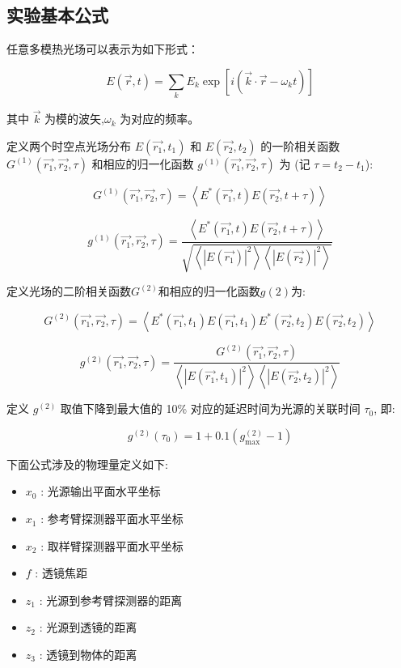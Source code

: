\documentclass[12pt,a4paper]{article}
\newcommand{\be}[1]{
    \begin{equation}
        #1
    \end{equation}
}
\begin{document}
\subsection{实验基本公式}
任意多模热光场可以表示为如下形式：
\be{E(\vec{r}, t)=\sum_{k} E_{k} \exp \left[i\left(\vec{k} \cdot \vec{r}-\omega_{k} t\right)\right]}
其中 $\vec k$ 为模的波矢,$\omega_k$ 为对应的频率。

定义两个时空点光场分布 $E(\vec{r_1}, t_1)$ 和 $E(\vec{r_2}, t_2)$ 的一阶相关函数 $G^{(1)}(\vec{r_1},\vec{r_2}, \tau)$ 和相应的归一化函数\cite{mandel1995optical}
$g^{(1)}(\vec{r_1},\vec{r_2}, \tau)$ 为 (记 $\tau = t_2 − t_1$):
\be{G^{(1)}\left(\overrightarrow{r_{1}}, \overrightarrow{r_{2}}, \tau\right)=\left\langle E^{*}\left(\overrightarrow{r_{1}}, t\right) E\left(\overrightarrow{r_{2}}, t+\tau\right)\right\rangle}
\be{g^{(1)}\left(\overrightarrow{r_{1}}, \overrightarrow{r_{2}}, \tau\right)=\frac{\left\langle E^{*}\left(\overrightarrow{r_{1}}, t\right) E\left(\overrightarrow{r_{2}}, t+\tau\right)\right\rangle}{\sqrt{\left\langle\left|E\left(\overrightarrow{r_{1}}\right)\right|^{2}\right\rangle\left\langle\left|E\left(\overrightarrow{r_{2}}\right)\right|^{2}\right\rangle}}}
定义光场的二阶相关函数$ G^{(2)} $和相应的归一化函数$ g(2) $为:
\be{G^{(2)}\left(\overrightarrow{r_{1}}, \overrightarrow{r_{2}}, \tau\right)=\left\langle E^{*}\left(\overrightarrow{r_{1}}, t_{1}\right) E\left(\overrightarrow{r_{1}}, t_{1}\right) E^{*}\left(\overrightarrow{r_{2}}, t_{2}\right) E\left(\overrightarrow{r_{2}}, t_{2}\right)\right\rangle}
\be{g^{(2)}\left(\overrightarrow{r_{1}}, \overrightarrow{r_{2}}, \tau\right)=\frac{G^{(2)}\left(\overrightarrow{r_{1}}, \overrightarrow{r_{2}}, \tau\right)}{\left\langle\left|E\left(\overrightarrow{r_{1}}, t_{1}\right)\right|^{2}\right\rangle\left\langle\left|E\left(\overrightarrow{r_{2}}, t_{2}\right)\right|^{2}\right\rangle}}
定义 $g^{(2)}$ 取值下降到最大值的 10\% 对应的延迟时间为光源的关联时间 $\tau_0$\cite{loudon2000quantum}, 即:
\be{g^{(2)}\left(\tau_{0}\right)=1+0.1\left(g_{\max }^{(2)}-1\right)}
下面公式涉及的物理量定义如下:
\begin{itemize}
\item  $x_{0}$  : 光源输出平面水平坐标
\item  $x_{1}$  : 参考臂探测器平面水平坐标
\item  $x_{2}$  : 取样臂探测器平面水平坐标
\item  $f$  : 透镜焦距
\item  $z_{1}$  : 光源到参考臂探测器的距离
\item  $z_{2}$  : 光源到透镜的距离
\item  $z_{3}$  : 透镜到物体的距离
\end{itemize}
\end{document}
